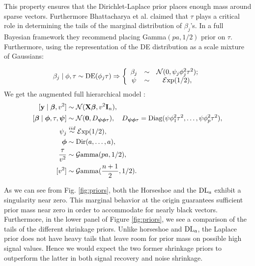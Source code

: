 \documentclass[10pt]{article}
\begin{document}
This property ensures that the Dirichlet-Laplace prior places enough mass around sparse vectors. Furthermore Bhattacharya et al. claimed that $\tau$ plays a critical role in determining the tails of the marginal distribution of $\beta_j$'s. In a full Bayesian framework they recommend placing \rm{Gamma}$(pa ,1/2)$ prior on $\tau$. Furthermore, using the representation of the \rm{DE} distribution as a scale mixture of Gaussians: 

\[ \beta_j \mid \phi , \tau \sim \text{\rm{DE}}(\phi_j \tau) \Rightarrow \left\{ \begin{array}{ccc}
\beta_j & \sim & \mathcal{N}(0 , \psi_j\phi^2_j\tau^2); \\
\psi & \sim & \mathcal{E}\mathrm{xp}(1/2),
\end{array} \right. 
\] 
We get the augmented full hierarchical model :
\begin{align} \label{sq_dl_h}
[ \y \mid \bbeta, v^2 ] & \sim \NormRV(\X \bbeta, v^2 \I_n), \\
[\bbeta \mid \bphi, \tau , \bpsi ] & \sim \NormRV(\0, D_{\bpsi \bphi \tau}), \quad D_{\bpsi \bphi \tau} = \text{Diag}(\psi\phi_1^2\tau^2, \ldots, \psi\phi_p^2\tau^2), \\
\psi_j & \stackrel{iid}{\sim} \mathcal{E}\mathrm{xp}(1/2), \\
\bphi & \sim \text{\rm{Dir}}(a, \ldots ,a), \\
\frac{\tau}{v^2} & \sim \mathcal{G}\mathrm{amma}(pa , 1/2), \\
[v^2] & \sim \mathcal{G}\mathrm{amma}(\frac{n+1}{2} , 1/2).  
\end{align}

As we can see from Fig. \ref{fig:priors}, both the Horseshoe and the $\text{\rm{DL}}_a$ exhibit a singularity near zero. This marginal behavior at the origin guarantees sufficient prior mass near zero in order to accommodate for nearly black vectors. Furthermore, in the lower panel of Figure \ref{fig:priors}, we see a comparison of the tails of the different shrinkage priors. Unlike horseshoe and $\text{\rm{DL}}_a$, the Laplace prior does not have heavy tails that leave room for prior mass on possible high signal values. Hence we would expect the two former shrinkage priors to outperform the latter in both signal recovery and noise shrinkage. 
\end{document}
